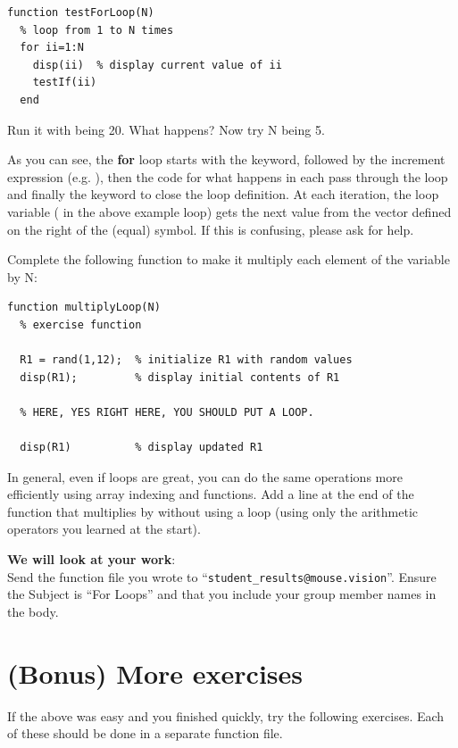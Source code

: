 \documentclass{article}
\begin{document}
\begin{lstlisting}
function testForLoop(N)
  % loop from 1 to N times
  for ii=1:N
    disp(ii)  % display current value of ii
    testIf(ii)
  end

\end{lstlisting}

Run it with  being 20. What happens? Now try N being 5.

As you can see, the \textbf{for} loop starts with the  keyword, followed by the increment expression (e.g. ), then the code for what happens in each pass through the loop and finally the  keyword to close the loop definition.
At each iteration, the loop variable ( in the above example loop) gets the next value from the vector defined on the right of the \mcode{=} (equal) symbol. If this is confusing, please ask for help.

Complete the following function to make it multiply each element of the variable  by N:
\begin{lstlisting}
function multiplyLoop(N)
  % exercise function

  R1 = rand(1,12);  % initialize R1 with random values
  disp(R1);         % display initial contents of R1

  % HERE, YES RIGHT HERE, YOU SHOULD PUT A LOOP.

  disp(R1)          % display updated R1
\end{lstlisting}

In general, even if loops are great, you can do the same operations more efficiently using array indexing and functions.
Add a line at the end of the function that multiplies  by  without using a loop (using only the arithmetic operators you learned at the start).


\textbf{We will look at your work}: \\
Send the function file you wrote to ``\verb|student_results@mouse.vision|''.
Ensure the Subject is ``For Loops'' and that you include your group member names in the body.


\pagebreak
\section{(Bonus) More exercises}

If the above was easy and you finished quickly, try the following exercises.
Each of these should be done in a separate function file.
\end{document}
